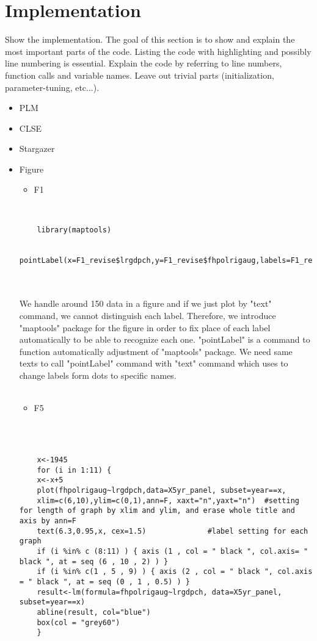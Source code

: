 \section{Implementation}\label{Sec:Implementation}

Show the implementation. The goal of this section is to show and explain the most important parts of the code. Listing the code with highlighting and possibly line numbering is essential.
Explain the code by referring to line numbers, function calls and variable names.
Leave out trivial parts (initialization, parameter-tuning, etc...).
\begin{itemize}
	\item PLM
	\item CLSE
	\item Stargazer
	\item Figure
	
	\begin{itemize}
		\item F1
	\end{itemize}
	\\
	\begin{lstlisting}
	library(maptools)
	
	pointLabel(x=F1_revise$lrgdpch,y=F1_revise$fhpolrigaug,labels=F1_revise$code,col="black")
	\end{lstlisting}
	\\
	\\
	
	We handle around 150 data in a figure and if we just plot by "text" command, we cannot distinguish each label. Therefore, we introduce "maptools" package for the figure in order to fix place of each label automatically to be able to recognize each one. "pointLabel" is a command to function automatically adjustment of "maptools" package. We need same texts to call "pointLabel" command with "text" command which uses to change labels form dots to specific names. 
	\\
	\\
	
	\begin{itemize}
		\item F5
	\end{itemize}
	\\
	\\
	
	\begin{lstlisting}
	x<-1945
	for (i in 1:11) {
	x<-x+5
	plot(fhpolrigaug~lrgdpch,data=X5yr_panel, subset=year==x,
	xlim=c(6,10),ylim=c(0,1),ann=F, xaxt="n",yaxt="n")  #setting for length of graph by xlim and ylim, and erase whole title and axis by ann=F
	text(6.3,0.95,x, cex=1.5)              #label setting for each graph
	if (i %in% c (8:11) ) { axis (1 , col = " black ", col.axis= " black ", at = seq (6 , 10 , 2) ) }
	if (i %in% c(1 , 5 , 9) ) { axis (2 , col = " black ", col.axis = " black ", at = seq (0 , 1 , 0.5) ) }
	result<-lm(formula=fhpolrigaug~lrgdpch, data=X5yr_panel, subset=year==x)
	abline(result, col="blue")
	box(col = "grey60")
	}
	\end{lstlisting}
	

\end{itemize}
